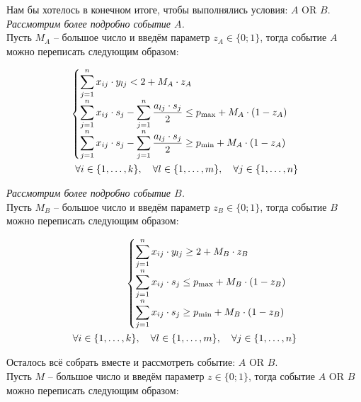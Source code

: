 \documentclass[14pt,fleqn]{extarticle}
\begin{document}
	Нам бы хотелось в конечном итоге, чтобы выполнялись условия: $A$ OR $B$.\\
	
	\textit{Рассмотрим более подробно событие $A$.}\\
	Пусть $M_A$ -- большое число и введём параметр $z_A \in \{0;1\}$, тогда событие $A$ можно переписать следующим образом:
	\begin{ceqn}
		\begin{align*}
			\begin{cases}
				\smashoperator[r]{\sum_{j=1}^{n}} x_{ij} \cdot y_{lj} < 2 + M_A \cdot z_A\\
				\smashoperator[r]{\sum_{j=1}^{n}} x_{ij} \cdot s_j - \smashoperator[r]{\sum_{j=1}^{n}} \dfrac{a_{lj} \cdot s_j}{2} \leq p_{\max} +  M_A \cdot (1 - z_A)\\
				\smashoperator[r]{\sum_{j=1}^{n}} x_{ij} \cdot s_j - \smashoperator[r]{\sum_{j=1}^{n}} \dfrac{a_{lj} \cdot s_j}{2} \geq p_{\min} +  M_A \cdot (1 - z_A)\\
			\end{cases}\\
			\forall i \in \{1, \dots, k\}, \quad \forall l \in \{1, \dots, m\}, \quad \forall j \in \{1, \dots, n\}
		\end{align*}
	\end{ceqn}
	
	\textit{Рассмотрим более подробно событие $B$.}\\
	Пусть $M_B$ -- большое число и введём параметр $z_B \in \{0;1\}$, тогда событие $B$ можно переписать следующим образом:
	\begin{ceqn}
		\begin{align*}
			\begin{cases}
				\smashoperator[r]{\sum_{j=1}^{n}} x_{ij} \cdot y_{lj} \geq 2 + M_B \cdot z_B\\
				\smashoperator[r]{\sum_{j=1}^{n}} x_{ij} \cdot s_j \leq p_{\max} +  M_B \cdot (1 - z_B)\\
				\smashoperator[r]{\sum_{j=1}^{n}} x_{ij} \cdot s_j \geq p_{\min} + M_B \cdot (1 - z_B)\\
			\end{cases}\\
			\forall i \in \{1, \dots, k\}, \quad \forall l \in \{1, \dots, m\}, \quad \forall j \in \{1, \dots, n\}
		\end{align*}
	\end{ceqn}

	\newpage
	
	Осталось всё собрать вместе и рассмотреть событие: $A$ OR $B$.\\
	Пусть $M$ -- большое число и введём параметр $z \in \{0;1\}$, тогда событие $A$ OR $B$ можно переписать следующим образом:
	
\end{document}
